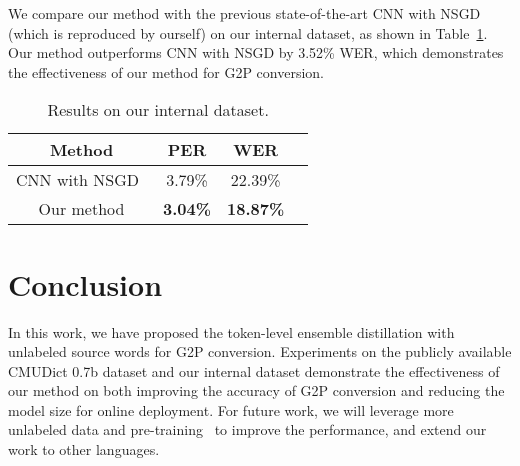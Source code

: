 \documentclass[a4paper]{article}
\begin{document}
We compare our method with the previous state-of-the-art CNN with NSGD~\cite{chae2018convolutional} (which is reproduced by ourself) on our internal dataset, as shown in Table~\ref{tab:result4}. Our method outperforms CNN with NSGD by 3.52\% WER, which demonstrates the effectiveness of our method for G2P conversion.
\vspace{-0.1cm}
\begin{table}[!htb]
  \caption{Results on our internal dataset.}
  \label{tab:result4}
  \centering
  \begin{tabular}{cccc}
   \toprule
    \textbf{Method}                     & \textbf{PER} &\textbf{WER}          \\
    \midrule
      CNN with NSGD~\cite{chae2018convolutional}               &3.79\%&22.39\%           \\
      Our method  &\textbf{3.04\%}&\textbf{18.87\%}            \\
\bottomrule
  \end{tabular}
\end{table}
\vspace{-0.5cm}

\section{Conclusion}

In this work, we have proposed the token-level ensemble distillation with unlabeled source words for G2P conversion. Experiments on the publicly available CMUDict 0.7b dataset and our internal dataset demonstrate the effectiveness of our method on both improving the accuracy of G2P conversion and reducing the model size for online deployment. For future work, we will leverage more unlabeled data and pre-training~\cite{song2019mass} to improve the performance, and extend our work to other languages. 








\end{document}
